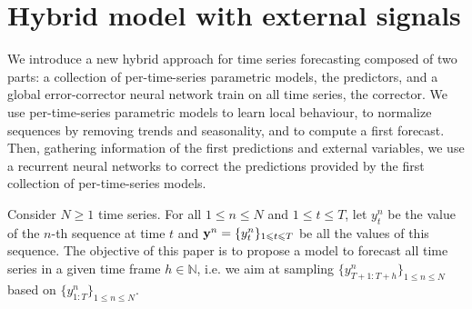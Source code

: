 \documentclass{article} %
\newcommand{\ts}{y}
\newcommand{\fullts}{{\bf \ts}}
\newcommand{\lag}{h}
\begin{document}
\section{Hybrid model with external signals}
\label{sec:hybrid}
We introduce a new hybrid approach for time series forecasting  composed of two parts: a collection of per-time-series parametric models, the predictors, and a global error-corrector neural network train on all time series, the corrector. We use  per-time-series parametric models to learn local behaviour, to normalize sequences by removing trends and seasonality,  and to compute a first forecast. Then, gathering information of the first predictions and external variables, we use a recurrent neural networks to correct the predictions provided by the first collection of per-time-series models.

Consider $N\geqslant 1$ time series. For all $1\leqslant n \leqslant N$ and $1\leqslant t \leqslant T$, let $\ts_t^n$ be the value of the $n$-th sequence at time $t$ and  $\fullts^n = \{\ts_t^n\}_{1\leqslant t \leqslant T}$ be all the values of this sequence.   The objective of this paper is to propose a model to  forecast all time series in a given time frame  $\lag \in \mathbb{N}$, i.e. we aim at sampling $\{\ts^n_{T+1:T+\lag}\}_{1\leqslant n \leqslant N}$ based on $\{\ts^n_{1:T}\}_{1\leqslant n \leqslant N}$.

\end{document}
